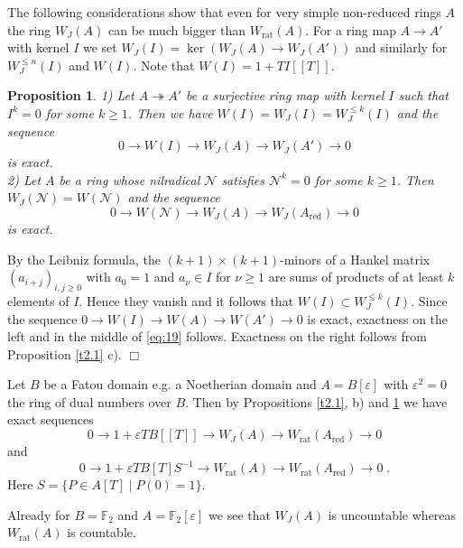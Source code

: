 \documentclass[12pt,leqno]{article}
\newcommand{\F}{{\mathbb{F}}}
\newcommand{\red}{\mathrm{red}}
\newcommand{\rat}{\mathrm{rat}}
\newcommand{\Nh}{{\mathcal N}}
\newtheorem{prop}[theorem]{Proposition}
\newenvironment{exmp}{\noindent{\bf Example}}{}
\newenvironment{proof}{\noindent {\bf Proof}}{\mbox{}\hspace*{\fill}$\Box$}
\begin{document}
The following considerations show that even for very simple non-reduced rings $A$ the ring $W_J (A)$ can be much bigger than $W_{\rat} (A)$. For a ring map $A \to A'$ with kernel $I$ we set $W_J (I) = \ker (W_J (A) \to W_J (A'))$ and similarly for $W^{\le n}_J (I)$ and $W (I)$. Note that $W (I) = 1 + TI [[T]]$. 

\begin{prop}
\label{t2.10}
1) Let $A \twoheadrightarrow A'$ be a surjective ring map with kernel $I$ such that $I^k = 0$ for some $k \ge 1$. Then we have $W (I) = W_J (I) = W^{\le k}_J (I)$ and the sequence
\begin{equation}
\label{eq:19}
0 \longrightarrow W (I) \longrightarrow W_J (A) \longrightarrow W_J (A') \longrightarrow 0 
\end{equation}
is exact.\\
2) Let $A$ be a ring whose nilradical $\Nh$ satisfies $\Nh^k = 0$ for some $k \ge 1$. Then $W_J (\Nh) = W (\Nh)$ and the sequence
\begin{equation}
\label{eq:20}
0 \longrightarrow W (\Nh) \longrightarrow W_J (A) \longrightarrow W_J (A_{\red}) \longrightarrow 0
\end{equation}
is exact.
\end{prop}

\begin{proof}
By the Leibniz formula, the $(k+1) \times (k+1)$-minors of a Hankel matrix $(a_{i+j})_{i,j \ge 0}$ with $a_0 = 1$ and $a_{\nu} \in I$ for $\nu \ge 1$ are sums of products of at least $k$ elements of $I$. Hence they vanish and it follows that $W (I) \subset W^{\le k}_J (I)$. Since the sequence $0 \to W (I) \to W (A) \to W (A') \to 0$ is exact, exactness on the left and in the middle of \eqref{eq:19} follows. Exactness on the right follows from Proposition \ref{t2.1} c).
\end{proof}

\begin{exmp}
Let $B$ be a Fatou domain e.g. a Noetherian domain and $A = B [\varepsilon]$ with $\varepsilon^2 = 0$ the ring of dual numbers over $B$. Then by Propositions \ref{t2.1}, b) and \ref{t2.10} we have exact sequences
\[
0 \longrightarrow 1 + \varepsilon TB [[T]] \longrightarrow W_J (A) \longrightarrow W_{\rat} (A_{\red}) \longrightarrow 0
\]
and
\[
0 \longrightarrow 1 + \varepsilon TB [T] S^{-1} \longrightarrow W_{\rat} (A) \longrightarrow W_{\rat} (A_{\red}) \longrightarrow 0 \; .
\]
Here $S = \{ P \in A [T] \mid P (0) = 1 \}$.

Already for $B = \F_2$ and $A = \F_2 [\varepsilon]$ we see that $W_J (A)$ is uncountable whereas $W_{\rat} (A)$ is countable.
\end{exmp}
%
\end{document}
